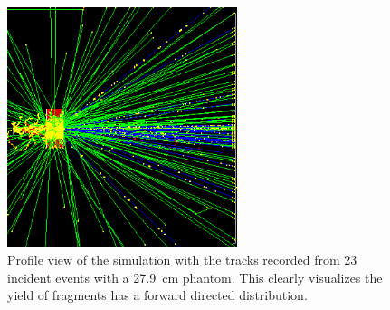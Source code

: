 \begin{figure}[h] 
\begin{center}
\includegraphics[width=0.6\textwidth]{images/twentyEvents.png}  
\caption{\label{fig:twentyEvents} Profile view of the simulation with the tracks recorded from 23 incident events with a 27.9~cm phantom. This clearly visualizes the yield of fragments has a forward directed distribution.}
\end{center}
\end{figure}


